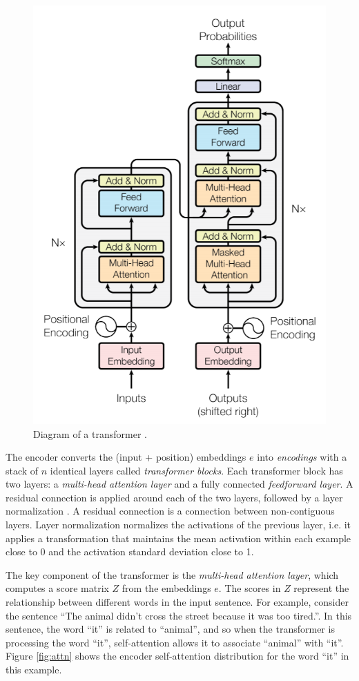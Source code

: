 
\begin{figure}[!h]
 \centering
 \includegraphics[width=0.55\columnwidth]{imgs/background/transformer.png}
 \caption{Diagram of a transformer \cite{vaswani2017attention}.}
 \label{fig:transformer}
\end{figure}

The encoder converts the (input + position) embeddings $e$ into \textit{encodings} with a stack of $n$ identical layers called \textit{transformer blocks}. Each transformer block has two layers: a \textit{multi-head attention layer} and a fully connected \textit{feedforward layer}. A residual connection \cite{he2016deep} is applied around each of the two layers, followed by a layer normalization \cite{ba2016layer}. A residual connection is a connection between non-contiguous layers. Layer normalization normalizes the activations of the previous layer, i.e. it applies a transformation that maintains the mean activation within each example close to 0 and the activation standard deviation close to 1.

The key component of the transformer is the \textit{multi-head attention layer}, which computes a score matrix $Z$ from the embeddings $e$. The scores in $Z$ represent the relationship between different words in the input sentence. For example, consider the sentence ``The animal didn't cross the street because it was too tired.''. In this sentence, the word ``it'' is related to ``animal'', and so when the transformer is processing the word ``it'', self-attention allows it to associate ``animal'' with ``it''. Figure \ref{fig:attn} shows the encoder self-attention distribution for the word ``it'' in this example.

